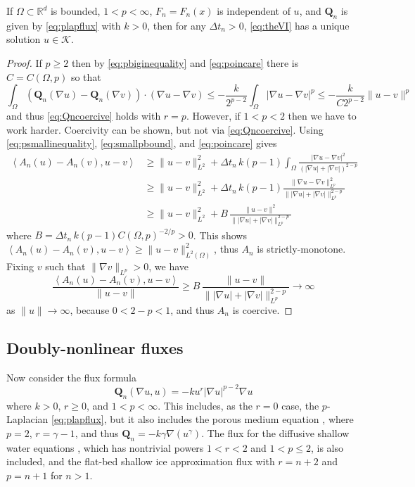 \documentclass[final,onefignum]{siamart190516}
\newcommand\bQ{\mathbf{Q}}
\newcommand{\grad}{\nabla}
\newcommand{\ip}[2]{\ensuremath{\left<#1,#2\right>}}
\newcommand\RR{\mathbb{R}}
\begin{document}
\begin{theorem}  \label{thm:plapwellposed}  If $\Omega\subset \RR^d$ is bounded, $1<p<\infty$, $F_n=F_n(x)$ is independent of $u$, and $\bQ_n$ is given by \eqref{eq:plapflux} with $k>0$, then for any $\Delta t_n>0$, \eqref{eq:theVI} has a unique solution $u\in\mathcal{K}$.
\end{theorem}

\begin{proof} If $p\ge 2$ then by \eqref{eq:pbiginequality} and \eqref{eq:poincare} there is $C=C(\Omega,p)$ so that
    $$\int_\Omega \left(\bQ_n(\grad u) - \bQ_n(\grad v)\right)\cdot (\grad u - \grad v) \le - \frac{k}{2^{p-2}} \int_\Omega |\grad u - \grad v|^p \le - \frac{k}{C 2^{p-2}} \|u-v\|^p$$
and thus \eqref{eq:Qncoercive} holds with $r=p$.  However, if  $1<p<2$ then we have to work harder.  Coercivity can be shown, but not via \eqref{eq:Qncoercive}.  Using \eqref{eq:psmallinequality}, \eqref{eq:smallpbound}, and \eqref{eq:poincare} gives
\begin{align*}
\ip{A_n(u) - A_n(v)}{u-v} &\ge \|u-v\|_{L^2}^2 + \Delta t_n\,k (p-1) \int_\Omega \frac{|\grad u - \grad v|^2}{\left(|\grad u|+|\grad v|\right)^{2-p}} \\
  &\ge \|u-v\|_{L^2}^2 + \Delta t_n\,k (p-1) \frac{\|\grad u - \grad v\|_{L^p}^2}{\big\||\grad u|+|\grad v|\big\|_{L^p}^{2-p}} \\
  &\ge \|u-v\|_{L^2}^2 + B\, \frac{\|u - v\|^2}{\big\||\grad u|+|\grad v|\big\|_{L^p}^{2-p}}
\end{align*}
where $B = \Delta t_n\,k (p-1) C(\Omega,p)^{-2/p} >0$.  This shows $\ip{A_n(u) - A_n(v)}{u-v} \ge \|u-v\|_{L^2(\Omega)}^2$, thus $A_n$ is strictly-monotone.  Fixing $v$ such that $\|\grad v\|_{L^p} >0$, we have
\begin{equation*}
\frac{\ip{A_n(u) - A_n(v)}{u-v}}{\|u-v\|} \ge B\, \frac{\|u - v\|}{\big\||\grad u|+|\grad v|\big\|_{L^p}^{2-p}} \to \infty
\end{equation*}
as $\|u\|\to\infty$, because $0<2-p<1$, and thus $A_n$ is coercive. \end{proof}

\subsection{Doubly-nonlinear fluxes} \label{subsec:powertransform}  Now consider the flux formula
\begin{equation}
  \bQ_n(\grad u,u) = - k u^r |\grad u|^{p-2} \grad u \label{eq:doubleflux}
\end{equation}
where $k>0$, $r\ge 0$, and $1<p<\infty$.  This includes, as the $r=0$ case, the $p$-Laplacian \eqref{eq:plapflux}, but it also includes the porous medium equation \cite{Vazquez2007}, where $p=2$, $r=\gamma-1$, and thus $\bQ_n = - k \gamma \grad(u^\gamma)$.  The flux for the diffusive shallow water equations \cite{AlonsoSantillanaDawson2008}, which has nontrivial powers $1<r<2$ and $1<p\le 2$, is also included, and the flat-bed shallow ice approximation \cite{CalvoDuranyVazquez2000} flux with $r=n+2$ and $p=n+1$ for $n>1$.
\end{document}

